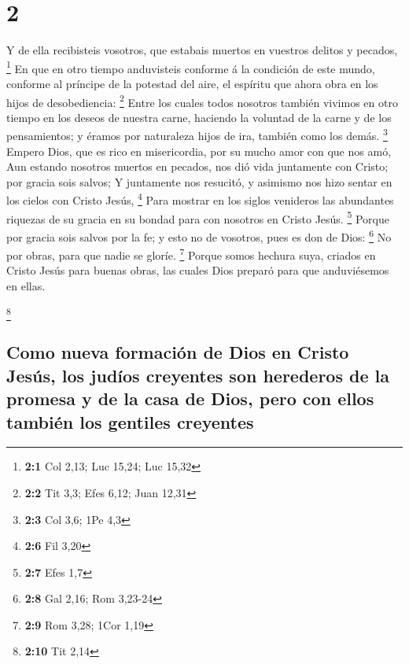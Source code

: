 \hypertarget{section-1}{%
\section{2}\label{section-1}}

 Y de ella recibisteis vosotros, que estabais muertos en
vuestros delitos y pecados, \footnote{\textbf{2:1} Col 2,13; Luc 15,24;
  Luc 15,32}  En que en otro tiempo anduvisteis conforme á
la condición de este mundo, conforme al príncipe de la potestad del
aire, el espíritu que ahora obra en los hijos de desobediencia:
\footnote{\textbf{2:2} Tit 3,3; Efes 6,12; Juan 12,31} 
Entre los cuales todos nosotros también vivimos en otro tiempo en los
deseos de nuestra carne, haciendo la voluntad de la carne y de los
pensamientos; y éramos por naturaleza hijos de ira, también como los
demás. \footnote{\textbf{2:3} Col 3,6; 1Pe 4,3}  Empero
Dios, que es rico en misericordia, por su mucho amor con que nos amó,
 Aun estando nosotros muertos en pecados, nos dió vida
juntamente con Cristo; por gracia sois salvos;  Y
juntamente nos resucitó, y asimismo nos hizo sentar en los cielos con
Cristo Jesús, \footnote{\textbf{2:6} Fil 3,20}  Para
mostrar en los siglos venideros las abundantes riquezas de su gracia en
su bondad para con nosotros en Cristo Jesús. \footnote{\textbf{2:7} Efes
  1,7}  Porque por gracia sois salvos por la fe; y esto no
de vosotros, pues es don de Dios: \footnote{\textbf{2:8} Gal 2,16; Rom
  3,23-24}  No por obras, para que nadie se gloríe.
\footnote{\textbf{2:9} Rom 3,28; 1Cor 1,19}  Porque somos
hechura suya, criados en Cristo Jesús para buenas obras, las cuales Dios
preparó para que anduviésemos en ellas.

\footnote{\textbf{2:10} Tit 2,14}

\hypertarget{como-nueva-formaciuxf3n-de-dios-en-cristo-jesuxfas-los-juduxedos-creyentes-son-herederos-de-la-promesa-y-de-la-casa-de-dios-pero-con-ellos-tambiuxe9n-los-gentiles-creyentes}{%
\subsection{Como nueva formación de Dios en Cristo Jesús, los judíos
creyentes son herederos de la promesa y de la casa de Dios, pero con
ellos también los gentiles
creyentes}\label{como-nueva-formaciuxf3n-de-dios-en-cristo-jesuxfas-los-juduxedos-creyentes-son-herederos-de-la-promesa-y-de-la-casa-de-dios-pero-con-ellos-tambiuxe9n-los-gentiles-creyentes}}

